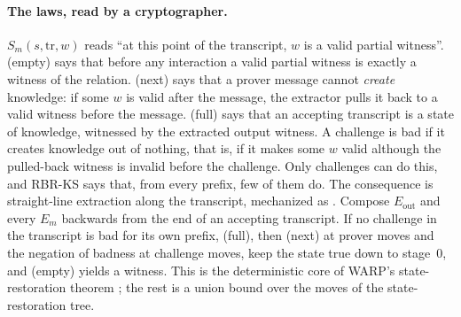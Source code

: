 \paragraph{The laws, read by a cryptographer.} $S_m(s,\mathrm{tr},w)$ reads \enquote{at this
point of the transcript, $w$ is a valid partial witness}. \textsf{(empty)} says that before any
interaction a valid partial witness is exactly a witness of the relation. \textsf{(next)} says that
a prover message cannot \emph{create} knowledge: if some $w$ is valid after the message, the
extractor pulls it back to a valid witness before the message. \textsf{(full)} says that an
accepting transcript is a state of knowledge, witnessed by the extracted output witness. A
challenge is bad if it creates knowledge out of nothing, that is, if it makes some $w$ valid
although the pulled-back witness is invalid before the challenge. Only challenges can do this, and
RBR-KS says that, from every prefix, few of them do. The consequence is straight-line extraction
along the transcript, mechanized as . Compose $E_{\mathrm{out}}$ and every
$E_m$ backwards from the end of an accepting transcript. If no challenge in the transcript is bad
for its own prefix, \textsf{(full)}, then \textsf{(next)} at prover moves and the negation of
badness at challenge moves, keep the state true down to stage~0, and \textsf{(empty)} yields a
witness. This is the deterministic core of WARP's state-restoration theorem
\cite[Thm.~B.4, Claim~B.6]{BCFW25-WARP}; the rest is a union bound over the moves of the state-restoration
tree.


